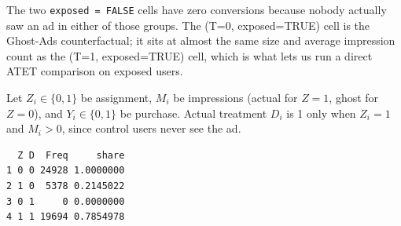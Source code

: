 \documentclass[
  letterpaper,
  DIV=11,
  numbers=noendperiod]{scrartcl}
\newenvironment{Shaded}{\begin{snugshade}}{\end{snugshade}}
\newcommand{\AttributeTok}[1]{\textcolor[rgb]{0.40,0.45,0.13}{#1}}
\newcommand{\DecValTok}[1]{\textcolor[rgb]{0.68,0.00,0.00}{#1}}
\newcommand{\FunctionTok}[1]{\textcolor[rgb]{0.28,0.35,0.67}{#1}}
\newcommand{\NormalTok}[1]{\textcolor[rgb]{0.00,0.23,0.31}{#1}}
\newcommand{\OtherTok}[1]{\textcolor[rgb]{0.00,0.23,0.31}{#1}}
\newcommand{\SpecialCharTok}[1]{\textcolor[rgb]{0.37,0.37,0.37}{#1}}
\begin{document}
The two \texttt{exposed\ =\ FALSE} cells have zero conversions because
nobody actually saw an ad in either of those groups. The (T=0,
exposed=TRUE) cell is the Ghost-Ads counterfactual; it sits at almost
the same size and average impression count as the (T=1, exposed=TRUE)
cell, which is what lets us run a direct ATET comparison on exposed
users.

Let \(Z_i \in \{0,1\}\) be assignment, \(M_i\) be impressions (actual
for \(Z=1\), ghost for \(Z=0\)), and \(Y_i \in \{0,1\}\) be purchase.
Actual treatment \(D_i\) is 1 only when \(Z_i = 1\) and \(M_i > 0\),
since control users never see the ad.

\begin{Shaded}
\end{Shaded}

\begin{verbatim}
  Z D  Freq     share
1 0 0 24928 1.0000000
2 1 0  5378 0.2145022
3 0 1     0 0.0000000
4 1 1 19694 0.7854978
\end{verbatim}

\begin{Shaded}
\end{Shaded}
\end{document}
